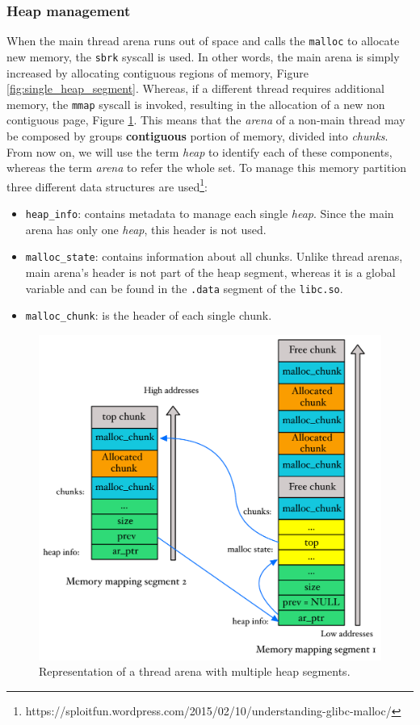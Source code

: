 \documentclass{article}
\numberwithin{equation}{subsection}
\begin{document}
\subsubsection{Heap management}
When the main thread arena runs out of space and calls the \texttt{malloc} to allocate new memory, the \texttt{sbrk} syscall is used. In other words, the main arena is simply increased by allocating contiguous regions of memory, Figure \ref{fig:single_heap_segment}. Whereas, if a different thread requires additional memory, the \texttt{mmap} syscall is invoked, resulting in the allocation of a new non contiguous page, Figure \ref{fig:multiple_heap_segments}. This means that the \emph{arena} of a non-main thread may be composed by groups \textbf{contiguous} portion of memory, divided into \emph{chunks}. From now on, we will use the term \emph{heap} to identify each of these components, whereas the term \emph{arena} to refer the whole set. To manage this memory partition three different data structures are used\footnote{https://sploitfun.wordpress.com/2015/02/10/understanding-glibc-malloc/}:
\begin{itemize}
    \item \texttt{heap\_info}: contains metadata to manage each single \emph{heap}. Since the main arena has only one \emph{heap}, this header is not used.
    \item \texttt{malloc\_state}: contains information about all chunks. Unlike thread arenas, main arena's header is not part of the heap segment, whereas it is a global variable and can be found in the \texttt{.data} segment of the \texttt{libc.so}.
    \item \texttt{malloc\_chunk}: is the header of each single chunk.
\end{itemize}
\begin{figure}[htb]
    \centering
    \includegraphics[width=\textwidth]{multiple_heap_segments.pdf}
    \caption{Representation of a thread arena with multiple heap segments.}
    \label{fig:multiple_heap_segments}
\end{figure}
\end{document}
